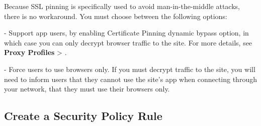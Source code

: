Because SSL pinning is specifically used to avoid man-in-the-middle attacks, there is no workaround. You must choose between the following options:


- Support app users, by enabling Certificate Pinning dynamic bypass option, in which case you can only decrypt browser traffic to the site. 
For more details, see \textbf{Proxy Profiles} > \textbf{\hyperlink{link:Trusted Certificate Authorities}{\color{linkblue}{Decryption Profile}}}.


- Force users to use browsers only. If you must decrypt traffic to the site, you will need to inform users that they cannot use the site’s app 
when connecting through your network, that they must use their browsers only.

\subsection*{\hypertarget{link:Create a Security Policy Rule}{Create a Security Policy Rule}}
\label{sec:policies:security:create}


